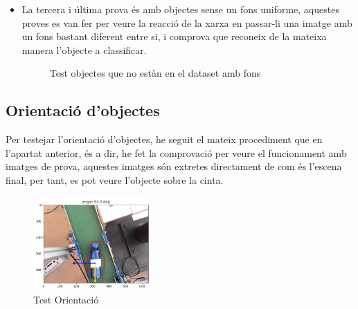 ﻿\documentclass[10pt,a4paper,twocolumn,twoside]{article}
\begin{document}
\begin{itemize}
	\item La tercera i última prova és amb objectes sense un fons uniforme, aquestes proves es van fer per veure la reacció de la xarxa en passar-li una imatge amb un fons bastant diferent entre si, i comprova que reconeix de la mateixa manera l'objecte a classificar.

\begin{figure} [h]
\footnotesize
\centering
{}
\end{figure}

\begin{figure} [h]
\footnotesize
\centering
{}
\caption{Test objectes que no estàn en el dataset amb fons}
\end{figure}
\end{itemize}

\subsection{Orientació d'objectes}

Per testejar l'orientació d'objectes, he seguit el mateix procediment que en l'apartat anterior, és a dir, he fet la comprovació per veure el funcionament amb imatges de prova, aquestes imatges són extretes directament de com és l'escena final, per tant, es pot veure l'objecte sobre la cinta.

 \begin{figure}[!h]
 \centering
    \includegraphics[width=0.4\textwidth]{img/axes.png}
    \caption{Test Orientació}
\end{figure}
\end{document}
